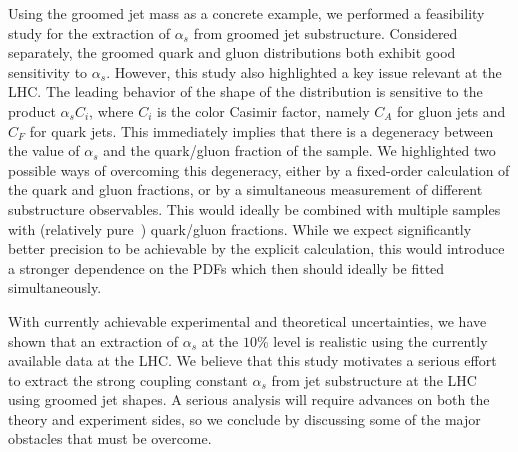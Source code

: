\documentclass[11pt,letterpaper]{article}
\begin{document}
Using the groomed jet mass as a concrete example, we performed a feasibility study for the extraction of $\alpha_s$ from groomed jet substructure.
%
Considered separately, the groomed quark and gluon distributions both exhibit good sensitivity to $\alpha_s$.
%
However, this study also highlighted a key issue relevant at the LHC.
%
The leading behavior of the shape of the distribution is sensitive to the product $\alpha_s C_i$, where $C_i$ is the color Casimir factor, namely $C_A$ for gluon jets and $C_F$ for quark jets.
%
This immediately implies that there is a degeneracy between the value of $\alpha_s$ and the quark/gluon fraction of the sample.
%
We highlighted two possible ways of overcoming this degeneracy, either by a fixed-order calculation of the quark and gluon fractions, or by a simultaneous measurement of different substructure observables.
%
This would ideally be combined with multiple samples with (relatively pure~\cite{Gallicchio:2011xc}) quark/gluon fractions.
%
While we expect significantly better precision to be achievable by the explicit calculation, this would introduce a stronger dependence on the PDFs which then should ideally be fitted simultaneously.

With currently achievable experimental and theoretical uncertainties, we have shown that an extraction of $\alpha_s$ at the $10\%$ level is realistic using the currently available data at the LHC.
%
We believe that this study motivates a serious effort to extract the strong coupling constant $\alpha_s$ from jet substructure at the LHC using groomed jet shapes.
%
A serious analysis will require advances on both the theory and experiment sides, so we conclude by discussing some of the major obstacles that must be overcome.
\end{document}
